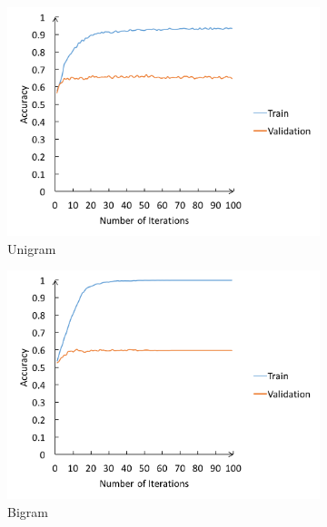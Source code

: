 \documentclass[11pt]{article}
\begin{document}
\begin{figure}
\begin{subfigure}{0.31\textwidth}
\includegraphics[width=\linewidth]{winnow_unigram.png}
\caption{Unigram} \label{fig:2a}
\end{subfigure}
\hspace*{\fill} %
\begin{subfigure}{0.31\textwidth}
\includegraphics[width=\linewidth]{winnow_bigram.png}
\caption{Bigram} \label{fig:2b}
\end{subfigure}
\hspace*{\fill} %
\begin{subfigure}{0.31\textwidth}

\end{subfigure}
\end{figure}
\end{document}
